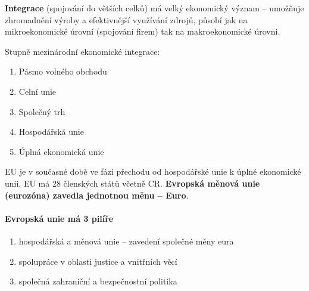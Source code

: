 \textbf{Integrace} (spojování do větších celků) má velký ekonomický význam -- umožňuje zhromadnění výroby a efektivnější využívání zdrojů, působí jak na mikroekonomické úrovní (spojování firem) tak na makroekonomické úrovni.

Stupně mezinárodní ekonomické integrace:
\begin{enumerate}   
    \item Pásmo volného obchodu
    \item Celní unie
    \item Společný trh
    \item Hospodářská unie
    \item Úplná ekonomická unie
\end{enumerate}

EU je v současné době ve fázi přechodu od hospodářské unie k úplné ekonomické unii. EU má 28 členských států včetně CR. \textbf{Evropská měnová unie (eurozóna) zavedla jednotnou měnu -- Euro}.

\paragraph{Evropská unie má 3 pilíře}
\begin{enumerate}
    \item hospodářská a měnová unie -- zavedení společné měny eura
    \item spolupráce v oblasti justice a vnitřních věcí
    \item společná zahraniční a bezpečnostní politika    
\end{enumerate}